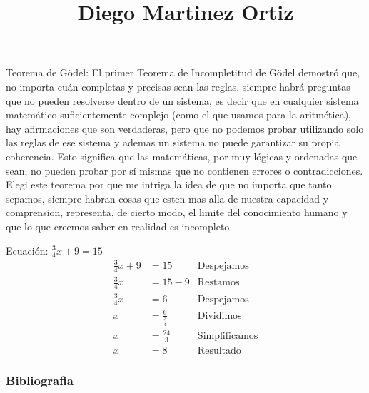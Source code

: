 \documentclass[11pt]{beamer}
\title{Diego Martinez Ortiz}
\begin{document}
\begin{frame}
  \titlepage
\end{frame}

\begin{frame}{Teorema de Gödel: \cite{paginaweb}}
  El primer Teorema de Incompletitud de Gödel demostró que, no importa cuán completas y precisas sean las reglas, siempre habrá preguntas que no pueden resolverse dentro de un sistema, es decir que en cualquier sistema matemático suficientemente complejo (como el que usamos para la aritmética), hay afirmaciones que son verdaderas, pero que no podemos probar utilizando solo las reglas de ese sistema y ademas un sistema no puede garantizar su propia coherencia. Esto significa que las matemáticas, por muy lógicas y ordenadas que sean, no pueden probar por sí mismas que no contienen errores o contradicciones.
  Elegi este teorema por que me intriga la idea de que no importa que tanto sepamos, siempre habran cosas que esten mas alla de nuestra capacidad y comprension, representa, de cierto modo, el limite del conocimiento humano y que lo que creemos saber en realidad es incompleto.
\end{frame}


\begin{frame}
        Ecuación: $\frac{3}{4}x+9 =15$
        \begin{align*}
           \frac{3}{4}x+9 &=15 &\text{Despejamos}\\
           \frac{3}{4}x &= 15-9 &\text{Restamos}\\
           \frac{3}{4}x &= 6 &\text{Despejamos}\\
           x &= \frac{6}{\frac{3}{4}} &\text{Dividimos}\\
           x &= \frac{24}{3} &\text{Simplificamos}\\
           x &= 8 &\text{Resultado}
        \end{align*}
\end{frame}


\begin{frame}
  
  \frametitle{Bibliografia}

  
  
  
  
\end{frame}
\end{document}
